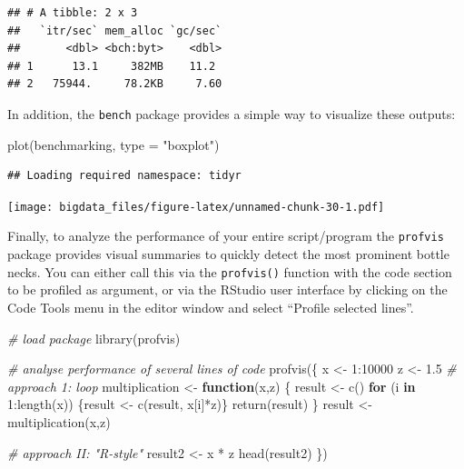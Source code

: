 \documentclass[
  12pt,
]{style/krantz}
\newenvironment{Shaded}{\begin{snugshade}}{\end{snugshade}}
\newcommand{\AttributeTok}[1]{\textcolor[rgb]{0.77,0.63,0.00}{#1}}
\newcommand{\CommentTok}[1]{\textcolor[rgb]{0.56,0.35,0.01}{\textit{#1}}}
\newcommand{\ControlFlowTok}[1]{\textcolor[rgb]{0.13,0.29,0.53}{\textbf{#1}}}
\newcommand{\DecValTok}[1]{\textcolor[rgb]{0.00,0.00,0.81}{#1}}
\newcommand{\FloatTok}[1]{\textcolor[rgb]{0.00,0.00,0.81}{#1}}
\newcommand{\FunctionTok}[1]{\textcolor[rgb]{0.00,0.00,0.00}{#1}}
\newcommand{\NormalTok}[1]{#1}
\newcommand{\OtherTok}[1]{\textcolor[rgb]{0.56,0.35,0.01}{#1}}
\newcommand{\SpecialCharTok}[1]{\textcolor[rgb]{0.00,0.00,0.00}{#1}}
\newcommand{\StringTok}[1]{\textcolor[rgb]{0.31,0.60,0.02}{#1}}
\begin{document}
\begin{verbatim}
## # A tibble: 2 x 3
##   `itr/sec` mem_alloc `gc/sec`
##       <dbl> <bch:byt>    <dbl>
## 1      13.1     382MB    11.2 
## 2   75944.     78.2KB     7.60
\end{verbatim}

In addition, the \texttt{bench} package provides a simple way to visualize these outputs:

\begin{Shaded}
\begin{Highlighting}[]
\FunctionTok{plot}\NormalTok{(benchmarking, }\AttributeTok{type =} \StringTok{"boxplot"}\NormalTok{)}
\end{Highlighting}
\end{Shaded}

\begin{verbatim}
## Loading required namespace: tidyr
\end{verbatim}

\texttt{[image: bigdata\_files/figure-latex/unnamed-chunk-30-1.pdf]}

Finally, to analyze the performance of your entire script/program the \texttt{profvis} package provides visual summaries to quickly detect the most prominent bottle necks. You can either call this via the \texttt{profvis()} function with the code section to be profiled as argument, or via the RStudio user interface by clicking on the Code Tools menu in the editor window and select ``Profile selected lines''.

\begin{Shaded}
\begin{Highlighting}[]
\CommentTok{\# load package}
\FunctionTok{library}\NormalTok{(profvis)}

\CommentTok{\# analyse performance of several lines of code}
\FunctionTok{profvis}\NormalTok{(\{}
\NormalTok{        x }\OtherTok{\textless{}{-}} \DecValTok{1}\SpecialCharTok{:}\DecValTok{10000}
\NormalTok{        z }\OtherTok{\textless{}{-}} \FloatTok{1.5}
        \CommentTok{\# approach 1: loop}
\NormalTok{multiplication }\OtherTok{\textless{}{-}} 
        \ControlFlowTok{function}\NormalTok{(x,z) \{}
\NormalTok{                result }\OtherTok{\textless{}{-}} \FunctionTok{c}\NormalTok{()}
                \ControlFlowTok{for}\NormalTok{ (i }\ControlFlowTok{in} \DecValTok{1}\SpecialCharTok{:}\FunctionTok{length}\NormalTok{(x)) \{result }\OtherTok{\textless{}{-}} \FunctionTok{c}\NormalTok{(result, x[i]}\SpecialCharTok{*}\NormalTok{z)\}}
                \FunctionTok{return}\NormalTok{(result)}
\NormalTok{        \}}
\NormalTok{result }\OtherTok{\textless{}{-}} \FunctionTok{multiplication}\NormalTok{(x,z)}

\CommentTok{\# approach II: "R{-}style"}
\NormalTok{result2 }\OtherTok{\textless{}{-}}\NormalTok{ x }\SpecialCharTok{*}\NormalTok{ z }
\FunctionTok{head}\NormalTok{(result2) }
\NormalTok{\})}
\end{Highlighting}
\end{Shaded}
\end{document}
